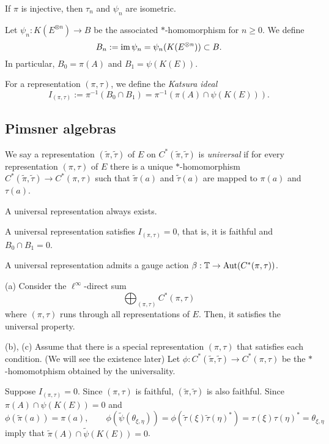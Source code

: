 \documentclass{../../../small}
\begin{document}
\begin{lem}
If $\pi$ is injective, then $\tau_n$ and $\psi_n$ are isometric.
\end{lem}


\begin{defn}[Core]
Let $\psi_n:K(E^{\otimes n})\to B$ be the associated $*$-homomorphism for $n\ge0$.
We define
\[ B_n:=\operatorname{im}\psi_n=\psi_n(K(E^{\otimes n}))\subset B.\]
In particular, $B_0=\pi(A)$ and $B_1=\psi(K(E))$.

\end{defn}


For a representation $(\pi,\tau)$, we define the \emph{Katsura ideal}
\[I_{(\pi,\tau)}:=\pi^{-1}(B_0\cap B_1)=\pi^{-1}(\pi(A)\cap\psi(K(E))).\]


\subsection{Pimsner algebras}


\begin{prop}
We say a representation $(\tilde\pi,\tilde\tau)$ of $E$ on $C^*(\tilde\pi,\tilde\tau)$ is \emph{universal} if for every representation $(\pi,\tau)$ of $E$ there is a unique $*$-homomorphism $C^*(\tilde\pi,\tilde\tau)\to C^*(\pi,\tau)$ such that $\tilde\pi(a)$ and $\tilde\tau(a)$ are mapped to $\pi(a)$ and $\tau(a)$.
\begin{parts}
\item A universal representation always exists.
\item A universal representation satisfies $I_{(\pi,\tau)}=0$, that is, it is faithful and $B_0\cap B_1=0$.
\item A universal representation admits a gauge action $\beta:\mathbb{T}\to\operatorname{Aut}(C^*(\pi,\tau))$.
\end{parts}
\end{prop}
\begin{pf}
(a)
Consider the $\ell^\infty$-direct sum
\[\bigoplus_{(\pi,\tau)}C^*(\pi,\tau)\]
where $(\pi,\tau)$ runs through all representations of $E$.
Then, it satisfies the universal property.

(b), (c)
Assume that there is a special representation $(\pi,\tau)$ that satisfies each condition.
(We will see the existence later)
Let $\phi:C^*(\tilde\pi,\tilde\tau)\to C^*(\pi,\tau)$ be the $*$-homomotphism obtained by the universality.

Suppose $I_{(\pi,\tau)}=0$.
Since $(\pi,\tau)$ is faithful, $(\tilde\pi,\tilde\tau)$ is also faithful.
Since $\pi(A)\cap\psi(K(E))=0$ and
\[\phi(\tilde\pi(a))=\pi(a),\qquad\phi(\tilde\psi(\theta_{\xi,\eta}))=\phi(\tilde\tau(\xi)\tilde\tau(\eta)^*)=\tau(\xi)\tau(\eta)^*=\theta_{\xi,\eta}\]
imply that $\tilde\pi(A)\cap\tilde\psi(K(E))=0$.
\end{pf}
\end{document}

